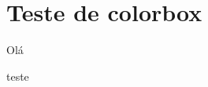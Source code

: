 \documentclass[a4paper]{article}
\begin{document}
\section{Teste de colorbox}%
\label{sec:teste_de_colorbox}

    Olá

    \begin{colorbox}[colback=col1]
       teste
    \end{colorbox}
\end{document}
